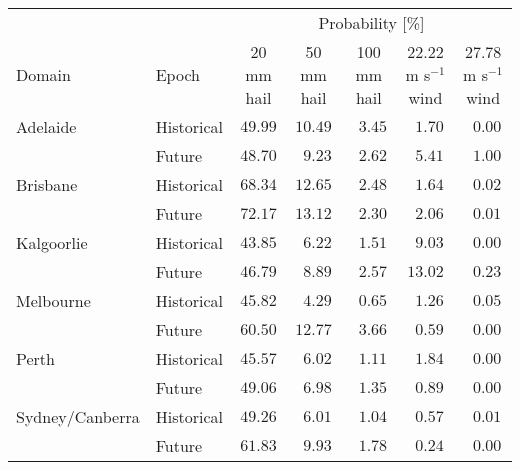 \begin{tabular}{llccccc}
\hline
& & \multicolumn{5}{c}{Probability [\%]} \\ 
Domain & Epoch & 20 mm hail & 50 mm hail & 100 mm hail & 22.22 m s$^{-1}$ wind & \multicolumn{1}{c}{27.78 m s$^{-1}$ wind} \\ 
\hline
Adelaide & Historical  & $49.99$ & $10.49$ & $\phantom{0}3.45$ & $\phantom{0}1.70$ & $\phantom{0}0.00$ \\
 & Future  & $48.70$ & $\phantom{0}9.23$ & $\phantom{0}2.62$ & $\phantom{0}5.41$ & $\phantom{0}1.00$ \\
Brisbane & Historical  & $68.34$ & $12.65$ & $\phantom{0}2.48$ & $\phantom{0}1.64$ & $\phantom{0}0.02$ \\
 & Future  & $72.17$ & $13.12$ & $\phantom{0}2.30$ & $\phantom{0}2.06$ & $\phantom{0}0.01$ \\
Kalgoorlie & Historical  & $43.85$ & $\phantom{0}6.22$ & $\phantom{0}1.51$ & $\phantom{0}9.03$ & $\phantom{0}0.00$ \\
 & Future  & $46.79$ & $\phantom{0}8.89$ & $\phantom{0}2.57$ & $13.02$ & $\phantom{0}0.23$ \\
Melbourne & Historical  & $45.82$ & $\phantom{0}4.29$ & $\phantom{0}0.65$ & $\phantom{0}1.26$ & $\phantom{0}0.05$ \\
 & Future  & $60.50$ & $12.77$ & $\phantom{0}3.66$ & $\phantom{0}0.59$ & $\phantom{0}0.00$ \\
Perth & Historical  & $45.57$ & $\phantom{0}6.02$ & $\phantom{0}1.11$ & $\phantom{0}1.84$ & $\phantom{0}0.00$ \\
 & Future  & $49.06$ & $\phantom{0}6.98$ & $\phantom{0}1.35$ & $\phantom{0}0.89$ & $\phantom{0}0.00$ \\
Sydney/Canberra & Historical  & $49.26$ & $\phantom{0}6.01$ & $\phantom{0}1.04$ & $\phantom{0}0.57$ & $\phantom{0}0.01$ \\
 & Future  & $61.83$ & $\phantom{0}9.93$ & $\phantom{0}1.78$ & $\phantom{0}0.24$ & $\phantom{0}0.00$ \\
\hline 
\end{tabular}
